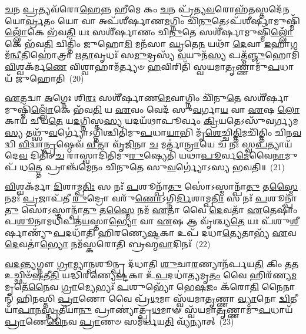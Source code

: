 \-\ul{𑌚}\-𑌨 \ul{𑌪𑍍𑌰}\-𑌤𑍍𑌯𑌵᳴𑌰𑍋\-\ul{𑌹𑍇}\-𑌨𑍍𑌨 𑌹𑍀𑌮𑍇 𑌕𑌂 \ul{𑌚}\-𑌨 𑌪𑍍𑌰᳴𑌤𑍍𑌯\-\ul{𑌵}\-𑌰𑍋𑌹᳴\-\ul{𑌤}\-𑌸𑍍𑌤𑌦𑍇᳴𑌨𑌯𑍋\-\ul{𑌰𑍍𑌵𑍍𑌰}\-𑌤𑌂 𑌯𑍋 𑌵𑌾 𑌅𑌪᳴𑌶𑍀𑌰𑍍\mbox{}𑌷𑌾𑌣\-\ul{𑌮}\-𑌗𑍍𑌨𑌿𑌂 𑌚𑌿᳴\-\ul{𑌨𑍁}\-𑌤𑍇\-𑌽𑌪᳴𑌶𑍀𑌰𑍍\mbox{}\-\ul{𑌷𑌾}\-𑌮𑍁𑌷𑍍𑌮𑌿᳴\-\ul{𑌲𑍍𑌲𑍋𑌁}\-𑌕𑍇 𑌭᳴𑌵\-\ul{𑌤𑌿} 𑌯𑌃 𑌸𑌶𑍀᳴𑌰𑍍\mbox{}𑌷𑌾𑌣𑌂 𑌚𑌿\-\ul{𑌨𑍁}\-𑌤𑍇 𑌸𑌶𑍀᳴𑌰𑍍\mbox{}\-\ul{𑌷𑌾}\-𑌮𑍁𑌷𑍍𑌮𑌿᳴\-\ul{𑌲𑍍𑌲𑍋𑌁}\-𑌕𑍇 𑌭᳴𑌵\-\ul{𑌤𑌿} 𑌚𑌿𑌤𑍍𑌤𑌿𑌂᳴ 𑌜𑍁𑌹𑍋\-\ul{𑌮𑌿} 𑌮𑌨᳴𑌸𑌾 \ul{𑌘𑍃}\-𑌤𑍇\-\ul{𑌨} 𑌯𑌥𑌾᳴ \ul{𑌦𑍇}\-𑌵𑌾 \ul{𑌇}\-𑌹𑌾𑌗𑌮᳴\-\ul{𑌨𑍍𑌵𑍀}\-𑌤𑌿𑌹𑍋॑𑌤𑍍𑌰𑌾 𑌋\-\ul{𑌤𑌾}\-𑌵𑍃𑌧𑌃᳴ 𑌸\-\ul{𑌮𑍁}\-𑌦𑍍𑌰𑌸𑍍𑌯᳴ \ul{𑌵}\-𑌯𑍁𑌨᳴\-\ul{𑌸𑍍𑌯} 𑌪𑌤𑍍𑌮᳴\-\ul{𑌞𑍍𑌜𑍁}\-𑌹𑍋𑌮𑌿᳴ \ul{𑌵𑌿}\-𑌶𑍍𑌵𑌕᳴𑌰𑍍𑌮\-\ul{𑌣𑍇} 𑌵𑌿𑌶𑍍𑌵𑌾𑌹𑌾𑌮᳴𑌰𑍍𑌤𑍍𑌯𑍞 \ul{𑌹}\-𑌵𑌿𑌰𑌿𑌤𑌿᳴ 𑌸𑍍𑌵𑌯𑌮𑌾\-\ul{𑌤𑍃}\-𑌣𑍍𑌣𑌾𑌮𑍁᳴\-\ul{𑌪}\-𑌧𑌾𑌯᳴ 𑌜𑍁𑌹𑍋𑌤𑌿~(20)

\-\ul{𑌏}\-𑌤𑌦𑍍𑌵𑌾 \ul{𑌅}\-𑌗𑍍𑌨𑍇𑌃 𑌶𑌿\-\ul{𑌰𑌃} 𑌸𑌶𑍀᳴𑌰𑍍\mbox{}𑌷𑌾𑌣\-\ul{𑌮𑍇}\-𑌵𑌾𑌗𑍍𑌨𑌿𑌂 𑌚𑌿᳴𑌨𑍁\-\ul{𑌤𑍇} 𑌸𑌶𑍀᳴𑌰𑍍\mbox{}\-\ul{𑌷𑌾}\-𑌮𑍁𑌷𑍍𑌮𑌿᳴\-\ul{𑌲𑍍𑌲𑍋𑌁}\-𑌕𑍇 𑌭᳴𑌵\-\ul{𑌤𑌿} 𑌯 \ul{𑌏}\-𑌵𑌂 𑌵𑍇𑌦᳴ 𑌸𑍁\-\ul{𑌵}\-𑌰𑍍𑌗𑌾\-\ul{𑌯} 𑌵𑌾 \ul{𑌏}\-𑌷 \ul{𑌲𑍋}\-𑌕𑌾𑌯᳴ 𑌚𑍀𑌯\-\ul{𑌤𑍇} 𑌯\-\ul{𑌦}\-𑌗𑍍𑌨𑌿𑌸𑍍𑌤\-\ul{𑌸𑍍𑌯} 𑌯𑌦𑌯᳴𑌥𑌾𑌪𑍂𑌰𑍍𑌵𑌂 \ul{𑌕𑍍𑌰𑌿}\-𑌯𑌤𑍇\-𑌽𑌸𑍁᳴𑌵𑌰𑍍𑌗𑍍𑌯𑌮\-\ul{𑌸𑍍𑌯} 𑌤𑌥𑍍𑌸𑍁᳴\-\ul{𑌵}\-𑌰𑍍𑌗𑍍𑌯𑍋॑\-𑌽𑌗𑍍𑌨𑌿𑌶𑍍𑌚𑌿𑌤𑌿᳴𑌮𑍁\-\ul{𑌪}\-𑌧𑌾\-\ul{𑌯𑌾}\-𑌭𑌿 𑌮𑍃᳴\-\ul{𑌶𑍇}\-𑌚𑍍𑌚𑌿\-\ul{𑌤𑍍𑌤𑌿}\-𑌮𑌚𑌿᳴𑌤𑍍𑌤𑌿𑌂 𑌚𑌿𑌨\-\ul{𑌵}\-𑌦𑍍𑌵𑌿 \ul{𑌵𑌿}\-𑌦𑍍𑌵𑌾\-\ul{𑌨𑍍𑌪𑍃}\-𑌷𑍍𑌠𑍇𑌵᳴ \ul{𑌵𑍀}\-𑌤𑌾 𑌵𑍃᳴\-\ul{𑌜𑌿}\-𑌨𑌾 \ul{𑌚} 𑌮𑌰𑍍𑌤𑌾॑\-\ul{𑌨𑍍𑌰𑌾}\-𑌯𑍇 𑌚᳴ 𑌨𑌃 𑌸𑍍𑌵\-\ul{𑌪}\-𑌤𑍍𑌯𑌾𑌯᳴ 𑌦𑍇\-\ul{𑌵} 𑌦𑌿𑌤𑌿𑌂᳴ \ul{𑌚} 𑌰𑌾𑌸𑍍𑌵𑌾𑌦𑌿᳴𑌤𑌿𑌮𑍁\-\ul{𑌰𑍁}\-𑌷𑍍𑌯𑍇𑌤𑌿᳴ 𑌯𑌥𑌾\-\ul{𑌪𑍂}\-𑌰𑍍𑌵\-\ul{𑌮𑍇}\-𑌵𑍈\-\ul{𑌨𑌾}\-𑌮𑍁𑌪᳴ 𑌧\-\ul{𑌤𑍍𑌤𑍇} 𑌪𑍍𑌰𑌾𑌞𑍍𑌚᳴𑌮𑍇𑌨𑌂 𑌚𑌿𑌨𑍁𑌤𑍇 𑌸𑍁\-\ul{𑌵}\-𑌰𑍍𑌗𑍍𑌯𑍋॑\-𑌽𑌸𑍍𑌯 𑌭𑌵𑌤𑌿॥~(21)

{\anuvakamend[{𑌓𑌷᳴𑌧\-\ul{𑌯𑌃} 𑌕𑌞𑍍𑌜𑍁᳴𑌹𑍋𑌤𑌿 𑌸𑍍𑌵\-\ul{𑌪}\-𑌤𑍍𑌯𑌾\-\ul{𑌯𑌾}\-𑌷𑍍𑌟𑌾𑌦᳴𑌶 𑌚}]}%

\-\ul{𑌵𑌿}\-𑌶𑍍𑌵𑌕᳴𑌰𑍍𑌮𑌾 \ul{𑌦𑌿}\-𑌶𑌾𑌮𑍍𑌪\-\ul{𑌤𑌿𑌃} 𑌸 𑌨𑌃᳴ \ul{𑌪}\-𑌶𑍂𑌨𑍍𑌪𑌾᳴\-\ul{𑌤𑍁} 𑌸𑍋॑\-𑌽𑌸𑍍𑌮𑌾𑌨𑍍𑌪𑌾᳴\-\ul{𑌤𑍁} 𑌤\-\ul{𑌸𑍍𑌮𑍈} 𑌨𑌮𑌃᳴ \ul{𑌪𑍍𑌰}\-𑌜𑌾𑌪᳴𑌤𑍀 \ul{𑌰𑍁}\-𑌦𑍍𑌰𑍋 𑌵𑌰𑍁᳴\-\ul{𑌣𑍋}\-\-𑌽𑌗𑍍𑌨𑌿\-\ul{𑌰𑍍𑌦𑌿}\-𑌶𑌾𑌮𑍍𑌪\-\ul{𑌤𑌿𑌃} 𑌸 𑌨𑌃᳴ \ul{𑌪}\-𑌶𑍂𑌨𑍍𑌪𑌾᳴\-\ul{𑌤𑍁} 𑌸𑍋॑\-𑌽𑌸𑍍𑌮𑌾𑌨𑍍𑌪𑌾᳴\-\ul{𑌤𑍁} 𑌤\-\ul{𑌸𑍍𑌮𑍈} 𑌨𑌮᳴ \ul{𑌏}\-𑌤𑌾 𑌵𑍈 \ul{𑌦𑍇}\-𑌵𑌤𑌾᳴ \ul{𑌏}\-𑌤𑍇𑌷𑌾𑌂॑ 𑌪\-\ul{𑌶𑍂}\-𑌨𑌾𑌮𑌧𑌿᳴𑌪𑌤\-\ul{𑌯}\-𑌸𑍍𑌤𑌾\-\ul{𑌭𑍍𑌯𑍋} 𑌵𑌾 \ul{𑌏}\-𑌷 𑌆 𑌵𑍃᳴𑌶𑍍𑌚𑍍𑌯\-\ul{𑌤𑍇} 𑌯𑌃 𑌪᳴𑌶𑍁\-\ul{𑌶𑍀}\-𑌰𑍍\mbox{}𑌷𑌾𑌣𑍍𑌯𑍁᳴\-\ul{𑌪}\-𑌦𑌧𑌾᳴𑌤𑌿 𑌹𑌿𑌰𑌣𑍍𑌯𑍇\-\ul{𑌷𑍍𑌟}\-𑌕𑌾 𑌉𑌪᳴ 𑌦𑌧𑌾\-\ul{𑌤𑍍𑌯𑍇}\-𑌤𑌾𑌭𑍍𑌯᳴ \ul{𑌏}\-𑌵 \ul{𑌦𑍇}\-𑌵𑌤𑌾॑\-\ul{𑌭𑍍𑌯𑍋} 𑌨𑌮᳴𑌸𑍍𑌕𑌰𑍋𑌤𑌿 𑌬𑍍𑌰𑌹𑍍𑌮\-\ul{𑌵𑌾}\-𑌦𑌿𑌨𑌃᳴~(22)

\-\ul{𑌵}\-\-\ul{𑌦}\-\-\ul{𑌨𑍍𑌤𑍍𑌯}\-𑌗𑍍𑌨𑍗 \ul{𑌗𑍍𑌰𑌾}\-𑌮𑍍𑌯𑌾\-\ul{𑌨𑍍𑌪}\-𑌶𑍂𑌨𑍍𑌪𑍍𑌰 𑌦᳴𑌧𑌾𑌤𑌿 \ul{𑌶𑍁}\-𑌚𑌾\-\ul{𑌰}\-𑌣𑍍𑌯𑌾𑌨᳴𑌰𑍍𑌪𑌯\-\ul{𑌤𑌿} 𑌕𑌿𑌂 𑌤\-\ul{𑌤} 𑌉𑌚𑍍𑌛𑌿𑍞᳴\-\ul{𑌷}\-𑌤𑍀\-\ul{𑌤𑌿} 𑌯𑌦𑍍𑌧𑌿᳴𑌰𑌣𑍍𑌯𑍇\-\ul{𑌷𑍍𑌟}\-𑌕𑌾 𑌉᳴\-\ul{𑌪}\-𑌦𑌧𑌾॑\-\ul{𑌤𑍍𑌯}\-𑌮𑍃\-\ul{𑌤𑌂} 𑌵𑍈 𑌹𑌿𑌰᳴𑌣𑍍𑌯\-\ul{𑌮}\-𑌮𑍃𑌤𑍇᳴\-\ul{𑌨𑍈}\-𑌵 \ul{𑌗𑍍𑌰𑌾}\-𑌮𑍍𑌯𑍇𑌭𑍍𑌯𑌃᳴ \ul{𑌪}\-𑌶𑍁𑌭𑍍𑌯𑍋᳴ 𑌭𑍇\-\ul{𑌷}\-𑌜𑌂 𑌕᳴𑌰𑍋\-\ul{𑌤𑌿} 𑌨𑍈𑌨𑌾𑌨𑍍᳴ 𑌹𑌿𑌨𑌸𑍍𑌤𑌿 \ul{𑌪𑍍𑌰𑌾}\-𑌣𑍋 𑌵𑍈 𑌪𑍍𑌰᳴\-\ul{𑌥}\-𑌮𑌾 𑌸𑍍𑌵᳴𑌯𑌮𑌾\-\ul{𑌤𑍃}\-𑌣𑍍𑌣𑌾 \ul{𑌵𑍍𑌯𑌾}\-𑌨𑍋 \ul{𑌦𑍍𑌵𑌿}\-𑌤𑍀𑌯𑌾᳴\-\ul{𑌪𑌾}\-𑌨\-\ul{𑌸𑍍𑌤𑍃}\-𑌤𑍀𑌯𑌾\-\ul{𑌨𑍁} 𑌪𑍍𑌰𑌾𑌣𑍍𑌯𑌾॑𑌤𑍍𑌪𑍍𑌰\-\ul{𑌥}\-𑌮𑌾𑍟 𑌸𑍍𑌵᳴𑌯𑌮𑌾\-\ul{𑌤𑍃}\-𑌣𑍍𑌣𑌾𑌮𑍁᳴\-\ul{𑌪}\-𑌧𑌾𑌯᳴ \ul{𑌪𑍍𑌰𑌾}\-𑌣𑍇\-\ul{𑌨𑍈}\-𑌵 \ul{𑌪𑍍𑌰𑌾}\-𑌣𑍞 𑌸𑌮᳴𑌰𑍍𑌧𑌯\-\ul{𑌤𑌿} 𑌵𑍍𑌯᳴𑌨𑍍𑌯𑌾𑌤𑍍~(23)

